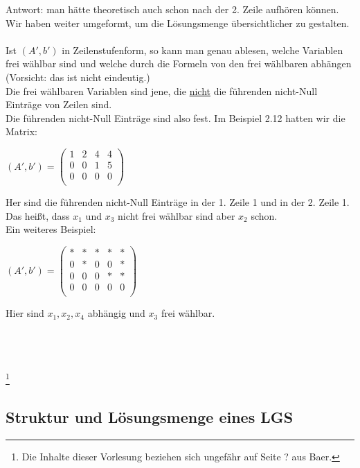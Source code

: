 \documentclass{article}
\begin{document}
Antwort: man hätte theoretisch auch schon nach der 2. Zeile aufhören können. Wir haben weiter umgeformt, um die Lösungsmenge übersichtlicher zu gestalten. \\
\\
Ist $(A',b')$ in Zeilenstufenform, so kann man genau ablesen, welche Variablen frei wählbar sind und welche durch die Formeln von den frei wählbaren abhängen (Vorsicht: das ist nicht eindeutig.) \\
Die frei wählbaren Variablen sind jene, die \underline{nicht} die führenden nicht-Null Einträge von Zeilen sind. \\
Die führenden nicht-Null Einträge sind also fest. Im Beispiel 2.12 hatten wir die Matrix: \\
\begin{center}
    $(A',b') = \begin{pmatrix}
        1 & 2 & 4 & 4 \\
        0 & 0 & 1 & 5 \\
        0 & 0 & 0 & 0 \\
    \end{pmatrix}$
\end{center}

Her sind die führenden nicht-Null Einträge in der 1. Zeile 1 und in der 2. Zeile 1. Das heißt, dass $x_1$ und $x_3$ nicht frei wählbar sind aber $x_2$ schon. \\
Ein weiteres Beispiel: \\
\begin{center}
    $(A',b') = \begin{pmatrix}
        * & * & * & * & * \\
        0 & * & 0 & 0 & * \\
        0 & 0 & 0 & * & * \\
        0 & 0 & 0 & 0 & 0 \\
    \end{pmatrix}$
\end{center}
Hier sind $x_1, x_2, x_4$ abhängig und $x_3$ frei wählbar. \\
\\
\\
\\
\date{Donnerstag, 09.11.23} \footnote[1]{Die Inhalte dieser Vorlesung beziehen sich ungefähr auf Seite ? aus Baer.} \\

\subsection{Struktur und Lösungsmenge eines LGS}
\end{document}
